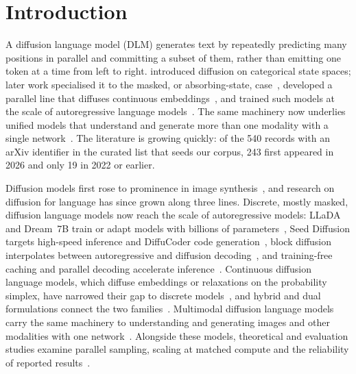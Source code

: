 \section{Introduction}
\label{sec:intro}

A diffusion language model (DLM) generates text by repeatedly predicting many positions in parallel and committing a subset of them, rather than emitting one token at a time from left to right. \citet{arXiv:2107.03006} introduced diffusion on categorical state spaces; later work specialised it to the masked, or absorbing-state, case~\cite{arXiv:2310.16834,arXiv:2406.07524,arXiv:2406.04329,arXiv:2406.03736}, developed a parallel line that diffuses continuous embeddings~\cite{arXiv:2205.14217}, and trained such models at the scale of autoregressive language models~\cite{arXiv:2502.09992}. The same machinery now underlies unified models that understand and generate more than one modality with a single network~\cite{arXiv:2503.20853,arXiv:2505.15809,arXiv:2408.12528}. The literature is growing quickly: of the 540 records with an arXiv identifier in the curated list that seeds our corpus, 243 first appeared in 2026 and only 19 in 2022 or earlier.

Diffusion models first rose to prominence in image synthesis~\cite{yang2023diffusion}, and research on diffusion for language has since grown along three lines. Discrete, mostly masked, diffusion language models now reach the scale of autoregressive models: LLaDA and Dream~7B train or adapt models with billions of parameters~\cite{arXiv:2502.09992,arXiv:2508.15487}, Seed Diffusion targets high-speed inference and DiffuCoder code generation~\cite{arXiv:2508.02193,arXiv:2506.20639}, block diffusion interpolates between autoregressive and diffusion decoding~\cite{arXiv:2503.09573}, and training-free caching and parallel decoding accelerate inference~\cite{arXiv:2505.22618,arXiv:2605.15609}. Continuous diffusion language models, which diffuse embeddings or relaxations on the probability simplex, have narrowed their gap to discrete models~\cite{arXiv:2502.13917,arXiv:2604.11748,arXiv:2603.02547,arXiv:2608.10615}, and hybrid and dual formulations connect the two families~\cite{arXiv:2510.22510,arXiv:2506.10892}. Multimodal diffusion language models carry the same machinery to understanding and generating images and other modalities with one network~\cite{arXiv:2505.15809,arXiv:2505.16839,arXiv:2505.16990,arXiv:2510.06308,arXiv:2604.00007,arXiv:2609.40362}. Alongside these models, theoretical and evaluation studies examine parallel sampling, scaling at matched compute and the reliability of reported results~\cite{arXiv:2505.21400,arXiv:2602.15014,arXiv:2507.15857,arXiv:2606.29228}.

